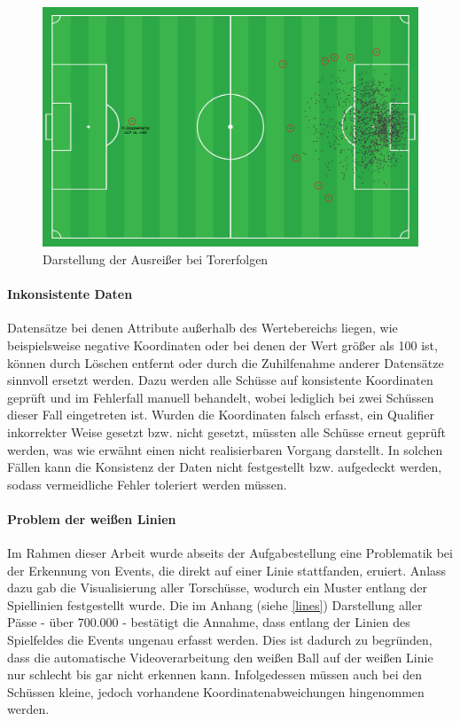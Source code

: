 \begin{figure}
\centering
\includegraphics[scale=0.4]{se-wa-jpg/outlier_shots}
\caption[Darstellung der Ausreißer bei Torerfolgen]{Darstellung der Ausreißer bei Torerfolgen}
\label{outlier_shots}
\end{figure}

\paragraph{Inkonsistente Daten} 
Datensätze bei denen Attribute außerhalb des Wertebereichs liegen, wie beispielsweise negative Koordinaten oder bei denen der Wert größer als 100 ist, können durch Löschen entfernt oder durch die Zuhilfenahme anderer Datensätze sinnvoll ersetzt werden. Dazu werden alle Schüsse auf konsistente Koordinaten geprüft und im Fehlerfall manuell behandelt, wobei lediglich bei zwei Schüssen dieser Fall eingetreten ist. Wurden die Koordinaten falsch erfasst, ein Qualifier inkorrekter Weise gesetzt bzw. nicht gesetzt, müssten alle Schüsse erneut geprüft werden, was wie erwähnt einen nicht realisierbaren Vorgang darstellt. In solchen Fällen kann die Konsistenz der Daten nicht festgestellt bzw. aufgedeckt werden, sodass vermeidliche Fehler toleriert werden müssen.

\paragraph{Problem der weißen Linien} 
Im Rahmen dieser Arbeit wurde abseits der Aufgabestellung eine Problematik bei der Erkennung von Events, die direkt auf einer Linie stattfanden, eruiert. Anlass dazu gab die Visualisierung aller Torschüsse, wodurch ein Muster entlang der Spiellinien festgestellt wurde. Die im Anhang (siehe \vref{lines}) Darstellung aller Pässe - über 700.000 - bestätigt die Annahme, dass entlang der Linien des Spielfeldes die Events ungenau erfasst werden. Dies ist dadurch zu begründen, dass die automatische Videoverarbeitung den weißen Ball auf der weißen Linie nur schlecht bis gar nicht erkennen kann. Infolgedessen müssen auch bei den Schüssen kleine, jedoch vorhandene Koordinatenabweichungen hingenommen werden.
	
